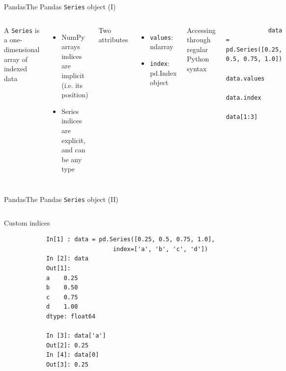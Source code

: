 \documentclass[10pt,compress]{beamer} %
\begin{document}
\begin{frame}[fragile]{Pandas}{The Pandas \texttt{Series} object (I)}
	\begin{columns}

	A \texttt{Series} is a one-dimensional array of indexed data
	\begin{itemize}
		\item NumPy arrays indices are implicit (i.e. its position)
		\item Series indices are explicit, and can be any type
	\end{itemize}
	Two attributes
	\begin{itemize}
		\item \texttt{values}: ndarray
		\item \texttt{index}: pd.Index object
	\end{itemize}
	Accessing through regular Python syntax

		\begin{exampleblock}{}
		\vspace{-0.2cm} 
			\begin{lstlisting}
			data = pd.Series([0.25, 0.5, 0.75, 1.0])
			data.values
			data.index
			data[1:3]
			\end{lstlisting}
		\vspace{-0.2cm} 
		\end{exampleblock}
	\end{columns}
\end{frame}

\begin{frame}[fragile]{Pandas}{The Pandas \texttt{Series} object (II)}
	\begin{columns}
 	   \column{0.8\textwidth}
		\begin{exampleblock}{\footnotesize{Custom indices}}
		\vspace{-0.2cm} 
			\begin{lstlisting}
			In[1] : data = pd.Series([0.25, 0.5, 0.75, 1.0],
			                   index=['a', 'b', 'c', 'd'])
			In [2]: data
			Out[1]: 
			a    0.25
			b    0.50
			c    0.75
			d    1.00
			dtype: float64

			In [3]: data['a']
			Out[2]: 0.25
			In [4]: data[0]
			Out[3]: 0.25
			\end{lstlisting}
		\vspace{-0.2cm} 
		\end{exampleblock}
	\end{columns}
\end{frame}
\end{document}
